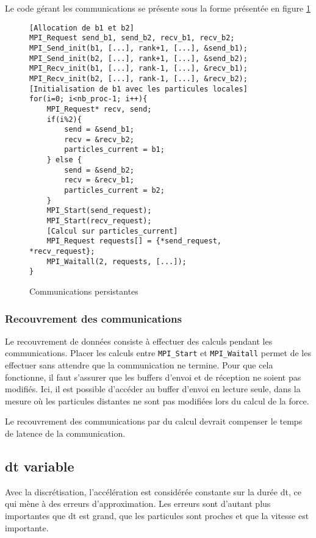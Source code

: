 Le code gérant les communications se présente sous la forme présentée en figure \ref{algo:persist}
\begin{figure}
\begin{verbatim}
[Allocation de b1 et b2]
MPI_Request send_b1, send_b2, recv_b1, recv_b2;
MPI_Send_init(b1, [...], rank+1, [...], &send_b1);
MPI_Send_init(b2, [...], rank+1, [...], &send_b2);
MPI_Recv_init(b1, [...], rank-1, [...], &recv_b1);
MPI_Recv_init(b2, [...], rank-1, [...], &recv_b2);
[Initialisation de b1 avec les particules locales]
for(i=0; i<nb_proc-1; i++){
    MPI_Request* recv, send;
    if(i%2){
        send = &send_b1;
        recv = &recv_b2;
        particles_current = b1;
    } else {
        send = &send_b2;
        recv = &recv_b1;
        particles_current = b2;
    }
    MPI_Start(send_request);
    MPI_Start(recv_request);
    [Calcul sur particles_current]
    MPI_Request requests[] = {*send_request, *recv_request};
    MPI_Waitall(2, requests, [...]);
}
\end{verbatim}
\caption{Communications persistantes}
\label{algo:persist}
\end{figure}

\subsubsection{Recouvrement des communications}

Le recouvrement de données consiste à effectuer des calculs pendant les communications. Placer les calculs entre \texttt{MPI\_Start} et \texttt{MPI\_Waitall} permet de les effectuer sans attendre que la communication ne termine. Pour que cela fonctionne, il faut s'assurer que les buffers d'envoi et de réception ne soient pas modifiés. Ici, il est possible d'accéder au buffer d'envoi en lecture seule, dans la mesure où les particules distantes ne sont pas modifiées lors du calcul de la force.

Le recouvrement des communications par du calcul devrait compenser le temps de latence de la communication.


\subsection{\textbf{dt} variable}

Avec la discrétisation, l'accélération est considérée constante sur la durée dt, ce qui mène à des erreurs d'approximation. Les erreurs sont d'autant plus importantes que dt est grand, que les particules sont proches et que la vitesse est importante.


